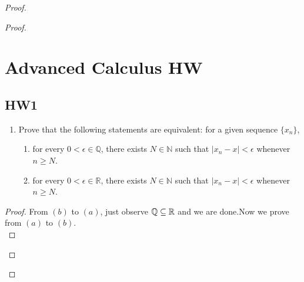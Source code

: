 \documentclass{report}
\begin{document}
\begin{proof}
\begin{proof}
\chapter{Advanced Calculus HW}
\section{HW1}
\begin{question}{}{}
\begin{enumerate}
    \item Prove that the following statements are equivalent: for a given sequence $\{x_n\}$,
    \begin{enumerate}
        \item for every $0 < \epsilon \in \mathbb{Q}$, there exists $N \in \mathbb{N}$ such that $|x_n - x| < \epsilon$ whenever $n \geq N$.
        \item for every $0 < \epsilon \in \mathbb{R}$, there exists $N \in \mathbb{N}$ such that $|x_n - x| < \epsilon$ whenever $n \geq N$.
    \end{enumerate}
\end{enumerate}
\end{question}
\begin{proof}
From $(b)$ to $(a)$, just observe  $\mathbb{Q} \subseteq \mathbb{R}$ and we are done.Now we prove from $(a)$ to $(b)$.\\


\end{proof}
\end{proof}
\end{proof}
\end{document}
